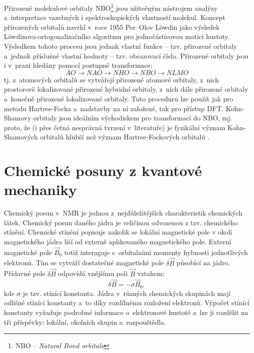 \documentclass[
digital, %
table,   %
nolof,     %
nolot,     %
oneside,
]{fithesis3}
\begin{document}
Přirozené molekulové orbitaly NBO\footnote{NBO -- \textit{Natural Bond orbitals}} jsou užitečným nástrojem analýzy a~interpretace vazebných i spektroskopických vlastností molekul. Koncept přirozených orbitalů navrhl v~roce 1955 Per--Olov Löwdin jako výsledek Löwdinova-ortogonalizačního algoritmu pro jednočásticovou matici hustoty. Výsledkem tohoto procesu jsou jednak vlastní funkce -- tzv. přirozené orbitaly a~jednak příslušné vlastní hodnoty -- tzv. obsazovací čísla. Přirozené orbitaly jsou i v~praxi hledány pomocí postupné transformace:
\begin{displaymath}
AO \longrightarrow NAO \longrightarrow NHO \longrightarrow NBO \longrightarrow NLMO
\end{displaymath}
tj. z~atomových orbitalů se vytvářejí přirozené atomové orbitaly, z~nich prostorově lokalizované přirozené hybridní orbitaly, z~nich dále přirozené orbitaly  a~konečně přirozené lokalizované orbitaly. Tuto proceduru lze použít jak pro metodu Hartree-Focka a~nadstavby na ní založené, tak pro přístup DFT. Kohn-Shamovy orbitaly jsou ideálním východiskem pro transformaci do NBO, mj. proto, že (i přes četná nesprávná tvrzení v~literatuře) je fyzikální význam Kohn-Shamových orbitalů hlubší než význam Hartree-Fockových orbitalů \cite{Bickelhauptdftreview}.

\section{Chemické posuny z kvantové mechaniky}
Chemický posun v~NMR je jednou z~nejdůležitějších charakteristik chemických látek. Chemický posun daného jádra je veličinou odvozenou z tzv. chemického stínění. Chemické stínění popisuje nakolik se lokální magnetické pole v okolí magnetického jádra liší od externě aplikovaného magnetického pole. Externí magnetické pole $\vec{B}_0$ totiž interaguje s~orbitalními momenty hybnosti jednotlivých elektronů. Tím se vytváří dostatečné magnetické pole $\delta \vec{B}$ působící na jádro. Přídavné pole $\delta \vec{B}$ odpovídá vnějšímu poli $\vec{B}$ vztahem:
\begin{equation}
\delta \vec{B} = - \sigma \vec{B}_0,
\end{equation}
kde $\sigma$ je tzv. stínící konstanta. Jádra v~různých chemických skupinách mají odlišné stínící konstanty  a~to díky rozdílnému rozložení elektronů. Výpočet stínící konstanty vyžaduje podrobné informace o~elektronové hustotě a~lze ji rozdělit na tři příspěvky: lokální, okolních skupin a~rozpouštědla.
\end{document}
